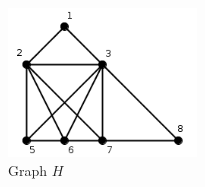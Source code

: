  \begin{figure}[htb]	
 \center%
 \includegraphics[width=5cm]{./img/grafoH.png}
 \caption{Graph $H$}
\label{fig:grafoH}
\end{figure}  
 